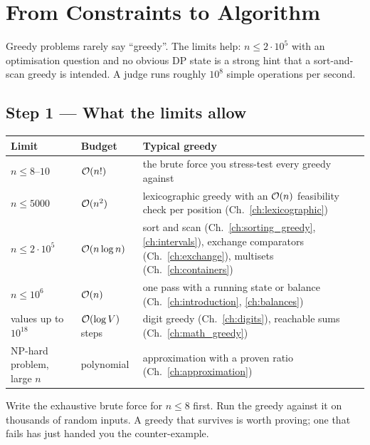 \chapter{From Constraints to Algorithm}
\label{ch:constraints}

Greedy problems rarely say ``greedy''. The limits help: $n \le 2\cdot10^5$ with an optimisation question and no obvious DP state is a strong hint that a sort-and-scan greedy is intended. A judge runs roughly $10^8$ simple operations per second.

\section*{Step 1 --- What the limits allow}

\begingroup\small\renewcommand{\arraystretch}{1.3}
\begin{tabularx}{\linewidth}{@{}l l X@{}}
\toprule
\textbf{Limit} & \textbf{Budget} & \textbf{Typical greedy} \\
\midrule
$n \le 8$--$10$ & $\mathcal{O}(n!)$ & the brute force you stress-test every greedy against \\
$n \le 5000$ & $\mathcal{O}(n^2)$ & lexicographic greedy with an $\mathcal{O}(n)$ feasibility check per position (Ch.~\ref{ch:lexicographic}) \\
$n \le 2\cdot10^5$ & $\mathcal{O}(n \log n)$ & sort and scan (Ch.~\ref{ch:sorting_greedy}, \ref{ch:intervals}), exchange comparators (Ch.~\ref{ch:exchange}), multisets (Ch.~\ref{ch:containers}) \\
$n \le 10^6$ & $\mathcal{O}(n)$ & one pass with a running state or balance (Ch.~\ref{ch:introduction}, \ref{ch:balances}) \\
values up to $10^{18}$ & $\mathcal{O}(\log V)$ steps & digit greedy (Ch.~\ref{ch:digits}), reachable sums (Ch.~\ref{ch:math_greedy}) \\
NP-hard problem, large $n$ & polynomial & approximation with a proven ratio (Ch.~\ref{ch:approximation}) \\
\bottomrule
\end{tabularx}
\endgroup

\begin{insightbox}
Write the exhaustive brute force for $n \le 8$ first. Run the greedy against it on thousands of random inputs. A greedy that survives is worth proving; one that fails has just handed you the counter-example.
\end{insightbox}

